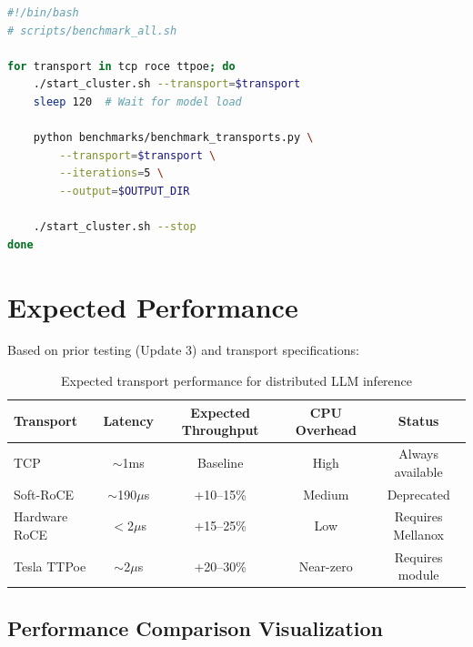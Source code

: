 \documentclass[10pt,letterpaper]{article}
\begin{document}
\begin{lstlisting}[language=bash]
#!/bin/bash
# scripts/benchmark_all.sh

for transport in tcp roce ttpoe; do
    ./start_cluster.sh --transport=$transport
    sleep 120  # Wait for model load

    python benchmarks/benchmark_transports.py \
        --transport=$transport \
        --iterations=5 \
        --output=$OUTPUT_DIR

    ./start_cluster.sh --stop
done
\end{lstlisting}

\section{Expected Performance}

Based on prior testing (Update 3) and transport specifications:

\begin{table}[H]
\centering
\small
\begin{tabular}{@{}lcccc@{}}
\toprule
\textbf{Transport} & \textbf{Latency} & \textbf{Expected Throughput} & \textbf{CPU Overhead} & \textbf{Status} \\
\midrule
TCP & $\sim$1ms & Baseline & High & Always available \\
Soft-RoCE & $\sim$190$\mu$s & +10--15\% & Medium & Deprecated \\
Hardware RoCE & $<$2$\mu$s & +15--25\% & Low & Requires Mellanox \\
Tesla TTPoe & $\sim$2$\mu$s & +20--30\% & Near-zero & Requires module \\
\bottomrule
\end{tabular}
\caption{Expected transport performance for distributed LLM inference}
\end{table}

\subsection{Performance Comparison Visualization}
\end{document}
